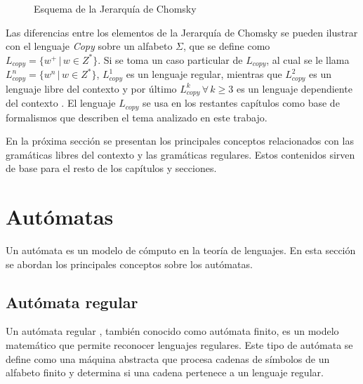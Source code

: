 \begin{figure}
      \centering
      \caption{Esquema de la Jerarquía de Chomsky}
      \label{fig:ChomskySchema} %
\end{figure}

Las diferencias entre los elementos de la Jerarquía de Chomsky se pueden ilustrar con el lenguaje 
\textit{Copy} sobre un alfabeto $\Sigma$, que se define como $L_{copy}=\{w^+\,|\,w\in Z^*\}$.
Si se toma un caso particular de $L_{copy}$, al cual se le llama $L_{copy}^n=\{w^n\,|\,w\in Z^*\}$,
$L_{copy}^1$ es un lenguaje regular, mientras que $L_{copy}^2$ es un lenguaje libre del contexto y por último
$L_{copy}^k\,\forall\,k\geq 3$ es un lenguaje dependiente del contexto \cite{authomataTheory}. El lenguaje 
$L_{copy}$ se usa en los restantes capítulos como base de formalismos que describen el tema analizado en este trabajo.

En la próxima sección se presentan los principales conceptos relacionados con las gramáticas libres del contexto y las 
gramáticas regulares. Estos contenidos sirven de base para el resto de los capítulos y secciones.
\section{Autómatas}
Un autómata es un modelo de cómputo en la teoría de lenguajes. En esta sección se abordan los principales conceptos sobre los autómatas.
\subsection{Autómata regular}

Un autómata regular \cite{authomataTheory}, también conocido como autómata finito, es un modelo matemático 
que permite reconocer lenguajes regulares. Este tipo de autómata se define como una máquina abstracta que 
procesa cadenas de símbolos de un alfabeto finito y determina si una cadena pertenece a un lenguaje regular.

